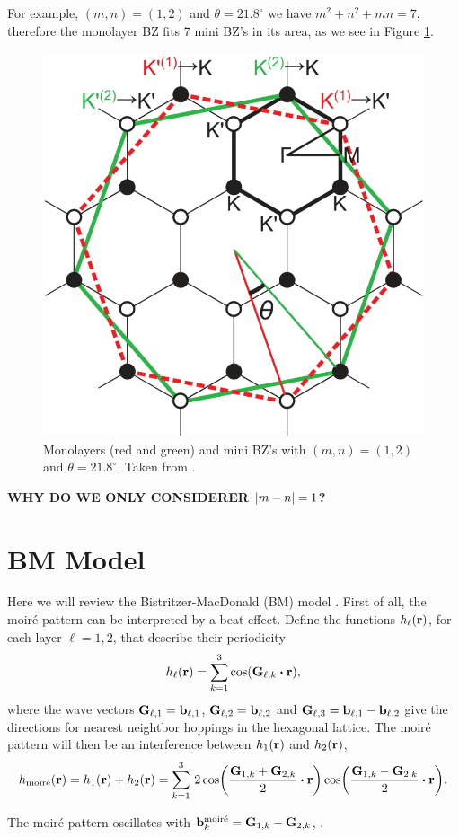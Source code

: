 \documentclass[a4paper,10pt]{article}
\begin{document}
\n

For example, $(m,n) = (1,2)$ and $\theta = 21.8^\circ$ we have $m^2 + n^2 + mn = 7$, therefore the monolayer BZ fits 7 mini BZ's in its area, as we see in Figure \ref{fig:bzminibz}.
\begin{figure}[H]
\centering
\includegraphics[width=0.5\linewidth]{fig/bzminibz.png}
\caption{Monolayers (red and green) and mini BZ's with $(m,n) = (1,2)$ and $\theta = 21.8^\circ$. Taken from \cite{koshino2012}.}
\label{fig:bzminibz}
\end{figure}

\n

\textbf{WHY DO WE ONLY CONSIDERER $\abs{m-n} = 1$?}

\pagebreak

\section{BM Model}

Here we will review the Bistritzer-MacDonald (BM) model \cite{macdonald2011}. First of all, the moiré pattern can be interpreted by a beat effect. Define the functions $h_\ell({\vb{r}})$, for each layer $\ell = 1, 2$, that describe their periodicity
$$
h_\ell(\r) = \sum_{k=1}^{3} \cos(\vb{G}_{\ell,k} \vdot \r),
$$
where the wave vectors $\vb{G}_{\ell,1} = \vb{b}_{\ell,1}$, $\vb{G}_{\ell,2} = \vb{b}_{\ell,2}$ and $\vb{G}_{\ell,3} = \vb{b}_{\ell,1} - \vb{b}_{\ell,2}$ give the directions for nearest neightbor hoppings in the hexagonal lattice. The moiré pattern will then be an interference between $h_1({\vb{r}})$ and $h_2({\vb{r}})$,
$$
h_{\text{moiré}}(\r) = h_1(\r) + h_2(\r) =
\sum_{k=1}^{3}
\, 2 \cos(\frac{\vb{G}_{1,k}+\vb{G}_{2,k}}{2} \vdot \r) \cos(\frac{\vb{G}_{1,k}-\vb{G}_{2,k}}{2} \vdot \r).
$$

The moiré pattern oscillates with $\vb{b}_k^{\text{moiré}} = \vb{G}_{1,k} - \vb{G}_{2,k}$, \cite{handbook2019}.
\end{document}
